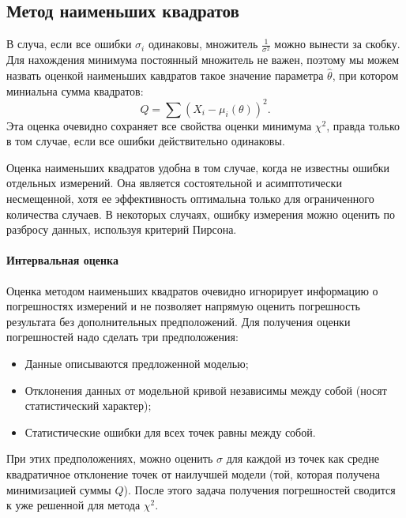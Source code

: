 \subsection{Метод наименьших квадратов}

    В случа, если все ошибки $\sigma_i$ одинаковы, множитель
$\frac{1}{\sigma^2}$ можно вынести за скобку. Для нахождения минимума
постоянный множитель не важен, поэтому мы можем назвать оценкой
наименьших кавдратов такое значение параметра $\hat\theta$, при
котором миниальна сумма квадратов: \begin{equation}
  Q = \sum{(X_i - \mu_i(\theta))^2}.
\end{equation} Эта оценка очевидно сохраняет все свойства оценки
минимума $\chi^2$, правда только в том случае, если все ошибки
действительно одинаковы.

Оценка наименьших квадратов удобна в том случае, когда не известны
ошибки отдельных измерений. Она является состоятельной и асимптотически
несмещенной, хотя ее эффективность оптимальна только для ограниченного
количества случаев. В некоторых случаях, ошибку измерения можно оценить
по разбросу данных, используя критерий Пирсона.

\paragraph{Интервальная оценка}

Оценка методом наименьших квадратов очевидно игнорирует информацию о
погрешностях измерений и не позволяет напрямую оценить погрешность
результата без дополнительных предположений. Для получения оценки
погрешностей надо сделать три предположения:

\begin{itemize}
    \item  Данные описываются предложенной моделью;
    \item  Отклонения данных от модельной кривой независимы между собой (носят
  статистический характер);
    \item  Статистические ошибки для всех точек равны между собой.
\end{itemize}

При этих предположениях, можно оценить $\sigma$ для каждой из точек
как средне квадратичное отклонение точек от наилучшей модели (той,
которая получена минимизацией суммы $Q$). После этого задача получения
погрешностей сводится к уже решенной для метода $\chi^2$.



